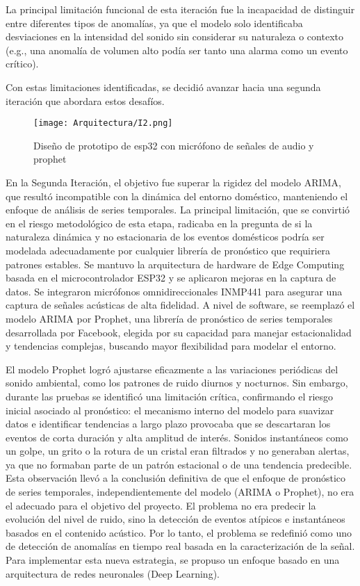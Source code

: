 La principal limitación funcional de esta iteración fue la incapacidad de distinguir entre diferentes tipos de anomalías, ya que el modelo solo identificaba desviaciones en la intensidad del sonido sin considerar su naturaleza o contexto (e.g., una anomalía de volumen alto podía ser tanto una alarma como un evento crítico).

Con estas limitaciones identificadas, se decidió avanzar hacia una segunda iteración que abordara estos desafíos.


      \begin{figure}[ht!]
            \centering
            \texttt{[image: Arquitectura/I2.png]}
            \caption{Diseño de prototipo de esp32 con micrófono de señales de audio y prophet}
            \label{fig:prototipo2}
      \end{figure}

      En la Segunda Iteración, el objetivo fue superar la rigidez del modelo ARIMA, que resultó incompatible con la dinámica del entorno doméstico, manteniendo el enfoque de análisis de series temporales. La principal limitación, que se convirtió en el riesgo metodológico de esta etapa, radicaba en la pregunta de si la naturaleza dinámica y no estacionaria de los eventos domésticos podría ser modelada adecuadamente por cualquier librería de pronóstico que requiriera patrones estables. Se mantuvo la arquitectura de hardware de Edge Computing basada en el microcontrolador ESP32 y se aplicaron mejoras en la captura de datos. Se integraron micrófonos omnidireccionales INMP441 para asegurar una captura de señales acústicas de alta fidelidad. A nivel de software, se reemplazó el modelo ARIMA por Prophet, una librería de pronóstico de series temporales desarrollada por Facebook, elegida por su capacidad para manejar estacionalidad y tendencias complejas, buscando mayor flexibilidad para modelar el entorno.
      
      El modelo Prophet logró ajustarse eficazmente a las variaciones periódicas del sonido ambiental, como los patrones de ruido diurnos y nocturnos. Sin embargo, durante las pruebas se identificó una limitación crítica, confirmando el riesgo inicial asociado al pronóstico: el mecanismo interno del modelo para suavizar datos e identificar tendencias a largo plazo provocaba que se descartaran los eventos de corta duración y alta amplitud de interés. Sonidos instantáneos como un golpe, un grito o la rotura de un cristal eran filtrados y no generaban alertas, ya que no formaban parte de un patrón estacional o de una tendencia predecible. Esta observación llevó a la conclusión definitiva de que el enfoque de pronóstico de series temporales, independientemente del modelo (ARIMA o Prophet), no era el adecuado para el objetivo del proyecto. El problema no era predecir la evolución del nivel de ruido, sino la detección de eventos atípicos e instantáneos basados en el contenido acústico. Por lo tanto, el problema se redefinió como uno de detección de anomalías en tiempo real basada en la caracterización de la señal. Para implementar esta nueva estrategia, se propuso un enfoque basado en una arquitectura de redes neuronales (Deep Learning). 

